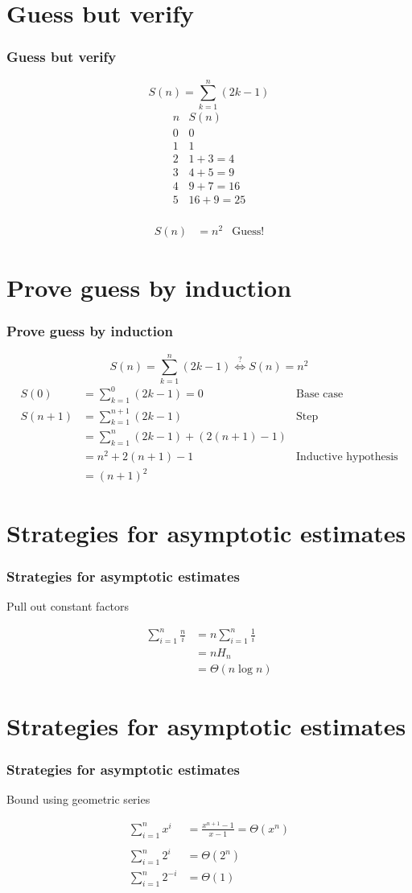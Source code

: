 \documentclass{beamer}
\newcommand{\sect}[1]{
\section{#1}
\begin{frame}[fragile]\frametitle{#1}
}
\begin{document}
\sect{Guess but verify}
\[
S(n) = \sum_{k=1}^n (2k-1)
\]
\[
\begin{array}{cr}
  n & S(n) \\\hline
  0 & 0 \\
  1 & 1 \\
  2 & 1 + 3 = 4\\
  3 & 4 + 5 = 9\\
  4 & 9 + 7 = 16\\
  5 & 16 + 9 = 25\\
\end{array}
\]

\begin{align*}
S(n) &= n^2  &\mbox{Guess!}
\end{align*}

\end{frame}
\sect{Prove guess by induction}
\[
S(n) = \sum_{k=1}^n (2k-1)
\stackrel{?}{\Longleftrightarrow}
S(n) = n^2 
\]
\begin{align*}
S(0) &=  \sum_{k=1}^0 (2k-1) = 0 & \mbox{Base case}\\
  S(n+1)
  &= \sum_{k=1}^{n+1} (2k-1) &\mbox{Step} \\
  &= \sum_{k=1}^{n} (2k-1) + (2(n+1) - 1)\\
  &= n^2 + 2(n+1) - 1 &\mbox{Inductive hypothesis}\\
  &= (n+1)^2
\end{align*}

\end{frame}

\sect{Strategies for asymptotic estimates}

Pull out constant factors

\begin{align*}
  \sum_{i=1}^n \frac{n}{i}
  &= n  \sum_{i=1}^n \frac{1}{i}\\
  &= nH_n\\
  &= \Theta(n\log n)
\end{align*}


\end{frame}

\sect{Strategies for asymptotic estimates}

Bound using geometric series

\begin{align*}
  \sum_{i=1}^n x^i &= \frac{x^{n+1}-1}{x-1} =\Theta(x^{n})
  \\\\
  \sum_{i=1}^n 2^i &= \Theta(2^{n})
  \\
  \sum_{i=1}^n 2^{-i} &= \Theta(1)
\end{align*}


\end{frame}
\end{document}
